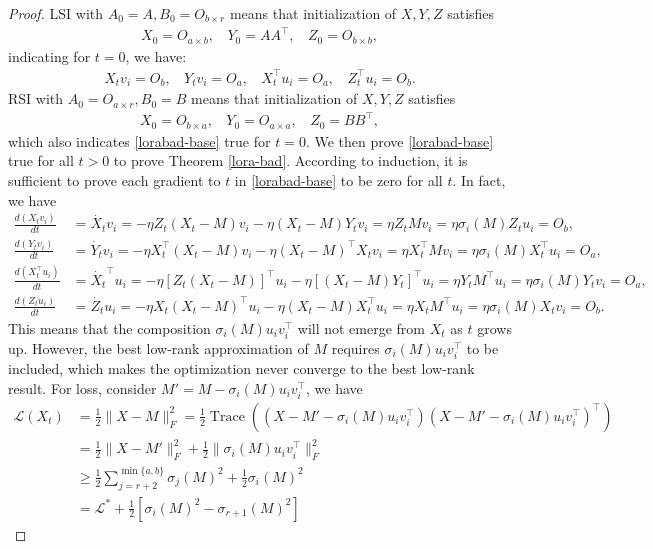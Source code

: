 \begin{proof}
    LSI with $A_0=A,B_0=O_{b\times r}$ means that initialization of $X,Y,Z$ satisfies
    \begin{align}
        X_0=O_{a\times b},~~~~Y_0=AA^\top ,~~~~Z_0=O_{b\times b},
    \end{align}
    indicating for $t=0$, we have:
    \begin{align}
        X_tv_i=O_b,~~~~Y_tv_i=O_a,~~~~X_t^\top u_i=O_a,~~~~Z_t^\top u_i=O_b. 
        \label{lorabad-base}
    \end{align}
    RSI with $A_0=O_{a\times r},B_0=B$ means that initialization of $X,Y,Z$ satisfies
    \begin{align}
        X_0=O_{b\times a},~~~~Y_0=O_{a\times a} ,~~~~Z_0=BB^\top,
    \end{align}
    which also indicates \ref{lorabad-base} true for $t=0$. We then prove \ref{lorabad-base} true for all $t>0$ to prove Theorem \ref{lora-bad}. According to induction, it is sufficient to prove each gradient to $t$ in \ref{lorabad-base} to be zero for all $t$. In fact, we have
    \begin{align}
        \frac{d(X_tv_i)}{dt}&=\dot{X_t}v_i=-\eta Z_t(X_t-M)v_i-\eta (X_t-M)Y_tv_i=\eta Z_tMv_i=\eta\sigma_i(M) Z_tu_i=O_b,\\
        \frac{d(Y_tv_i)}{dt}&=\dot{Y_t}v_i=-\eta X_t^\top (X_t-M)v_i-\eta (X_t-M)^\top X_tv_i=\eta X_t^\top Mv_i=\eta\sigma_i(M) X_t^\top u_i=O_a,\\
        \frac{d(X_t^\top u_i)}{dt}&=\dot{X_t}^\top u_i=-\eta \left[Z_t(X_t-M)\right]^\top u_i-\eta \left[(X_t-M)Y_t\right]^\top u_i=\eta Y_tM^\top u_i=\eta\sigma_i(M) Y_tv_i=O_a,\\
        \frac{d(Z_tu_i)}{dt}&=\dot{Z_t}u_i=-\eta X_t(X_t-M)^\top u_i -\eta (X_t-M)X_t^\top u_i=\eta X_tM^\top u_i=\eta\sigma_i(M) X_t v_i=O_b.
    \end{align}
    This means that the composition $\sigma_i(M)u_iv_i^\top$ will not emerge from $X_t$ as $t$ grows up. However, the best low-rank approximation of $M$ requires $\sigma_i(M)u_iv_i^\top$ to be included, which makes the optimization never converge to the best low-rank result. For loss, consider $M'=M-\sigma_i(M)u_iv_i^\top$, we have
    \begin{align}
        \mathcal{L}(X_t)&=\frac{1}{2}\|X-M\|_F^2=\frac{1}{2}\operatorname{Trace}((X-M'-\sigma_i(M)u_iv_i^\top)(X-M'-\sigma_i(M)u_iv_i^\top)^\top)\\
        &=\frac{1}{2}\|X-M'\|_F^2+\frac{1}{2}\|\sigma_i(M)u_iv_i^\top\|_F^2\\
        &\geq \frac{1}{2}\sum_{j=r+2}^{\min\{a,b\}}\sigma_j(M)^2+\frac{1}{2}\sigma_i(M)^2\\
        &=\mathcal{L}^*+\frac{1}{2}\left[\sigma_i(M)^2-\sigma_{r+1}(M)^2\right]
    \end{align}
\end{proof}


